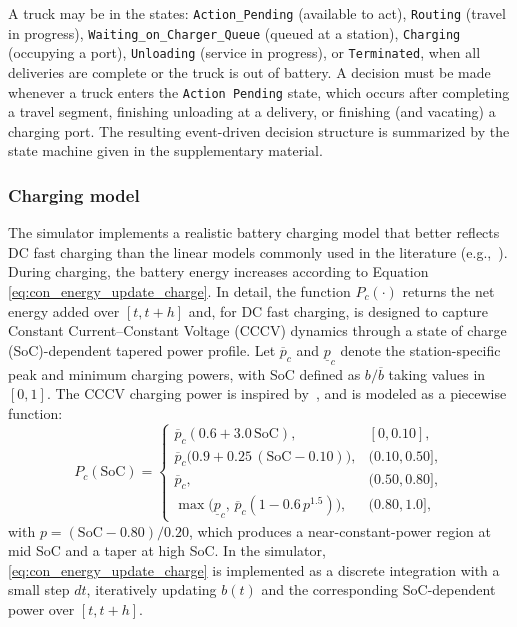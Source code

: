 \documentclass[journal]{IEEEtran}
\begin{document}
A truck may be in the states: \texttt{Action\_Pending} (available to act), \texttt{Routing} (travel in progress), \texttt{Waiting\_on\_Charger\_Queue} (queued at a station), \texttt{Charging} (occupying a port), \texttt{Unloading} (service in progress), or \texttt{Terminated}, when all deliveries are complete or the truck is out of battery. 
A decision must be made whenever a truck enters the \texttt{Action Pending} state, which occurs after completing a travel segment, finishing unloading at a delivery, or finishing (and vacating) a charging port. 
The resulting event-driven decision structure is summarized by the state machine given in the supplementary material.

\subsubsection{Charging model}\label{sec:charging_model}
The simulator implements a realistic battery charging model that better reflects DC fast charging than the linear models commonly used in the literature (e.g.,~\cite{BASSO2022102496,lin2022,11016767}).  
During charging, the battery energy increases according to Equation \eqref{eq:con_energy_update_charge}.
In detail, the function $P_c(\cdot)$ returns the net energy added over $[t,t+h]$ and, for DC fast charging, is designed to capture Constant Current--Constant Voltage (CCCV) dynamics through a state of charge (SoC)-dependent tapered power profile. Let $\overline{p}_c$ and $\underline{p}_c$ denote the station-specific peak and minimum charging powers, with SoC defined as $b/\overline{b}$ taking values in $[0,1]$. 
The CCCV charging power is inspired by~\cite{10225616}, and is modeled as a piecewise function:
\begin{equation}
P_c(\text{SoC})=
\begin{cases}
\overline{p}_c (0.6+3.0\,\text{SoC}), & [0,0.10],\\
\overline{p}_c \big(0.9+0.25\,(\text{SoC}-0.10)\big), & (0.10,0.50],\\
\overline{p}_c, & (0.50,0.80],\\
\max\!\big(\underline{p}_{c},\,\overline{p}_c(1-0.6\,p^{1.5})\big), & (0.80,1.0],
\end{cases}
\label{eq:cccv_profile}
\end{equation}
with $p=(\text{SoC}-0.80)/0.20$, which produces a near-constant-power region at mid SoC and a taper at high SoC.
In the simulator, \eqref{eq:con_energy_update_charge} is implemented as a discrete integration with a small step $dt$, iteratively updating $b(t)$ and the corresponding SoC-dependent power over $[t,t+h]$. %
\end{document}
